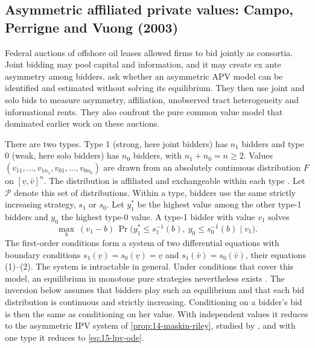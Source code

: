 \subsection{Asymmetric affiliated private values: Campo, Perrigne and Vuong (2003)}\label{sec:15-apv-cpv}

 Federal auctions of offshore oil leases allowed firms to bid jointly as consortia.
Joint bidding may pool capital and information, and it may create ex ante asymmetry among bidders.
\citet{CampoPerrigneVuong2003} ask whether an asymmetric APV model can be identified and estimated without
solving its equilibrium. They then use joint and solo bids to measure asymmetry, affiliation, unobserved
tract heterogeneity and informational rents. They also confront the pure common value model that dominated
earlier work on these auctions.

 There are two types. Type 1 (strong, here joint bidders) has $n_1$ bidders and type 0
(weak, here solo bidders) has $n_0$ bidders, with $n_1+n_0=n\ge2$. Values
$(v_{11},\dots,v_{1n_1},v_{01},\dots,v_{0n_0})$ are drawn from an absolutely continuous distribution $F$ on
$[\underline v,\bar v]^n$. The distribution is affiliated and exchangeable within each type
\citep[Section~2.1]{CampoPerrigneVuong2003}. Let $\mathcal P$ denote this set of distributions. Within a
type, bidders use the same strictly increasing strategy, $s_1$ or $s_0$. Let $y_1^\ast$ be the highest value
among the other type-1 bidders and $y_0$ the highest type-0 value. A type-1 bidder with value $v_1$ solves
\begin{equation*}
  \max_b\ (v_1-b)\,\Pr\bigl(y_1^\ast\le s_1^{-1}(b),\ y_0\le s_0^{-1}(b)\mid v_1\bigr).
\end{equation*}
The first-order conditions form a system of two differential equations with boundary conditions
$s_1(\underline v)=s_0(\underline v)=\underline v$ and $s_1(\bar v)=s_0(\bar v)$, their equations (1)--(2).
The system is intractable in general. Under conditions that cover this model, an equilibrium in monotone pure
strategies nevertheless exists \citep{RenyZamir2004}. The inversion below assumes that bidders play such an
equilibrium and that each bid distribution is continuous and strictly increasing. Conditioning on a bidder's bid is
then the same as conditioning on her value. With independent values it reduces to the asymmetric IPV system of
\cref{prop:14-maskin-riley}, studied by \citet{MaskinRiley2000}, and with one type it reduces to
\eqref{eq:15-lpv-ode}.

